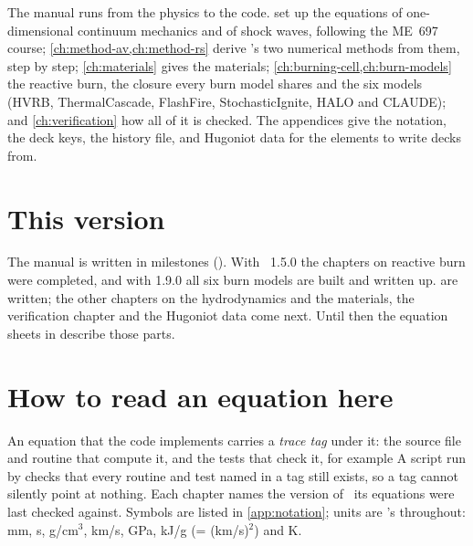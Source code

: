 The manual runs from the physics to the code. 
set up the equations of one-dimensional continuum mechanics and of shock
waves, following the ME~697 course; \cref{ch:method-av,ch:method-rs} derive
\bw's two numerical methods from them, step by step;
\cref{ch:materials} gives the materials; \cref{ch:burning-cell,ch:burn-models}
the reactive burn, the closure every burn model shares and the six models
(HVRB, ThermalCascade, FlashFire, StochasticIgnite, HALO and CLAUDE); and
\cref{ch:verification} how all of it is checked. The appendices give the
notation, the deck keys, the history file, and Hugoniot data for the
elements to write decks from.

\section{This version}

The manual is written in milestones (). With
\bw\ 1.5.0 the chapters on reactive burn were completed, and with 1.9.0
all six burn models are built and written up.
 are written; the other chapters on the hydrodynamics and the materials, the
verification chapter and the Hugoniot data come next. Until then the
equation sheets in  describe those parts.

\section{How to read an equation here}

An equation that the code implements carries a \emph{trace tag} under it:
the source file and routine that compute it, and the tests that check it,
for example
A script run by  checks that every routine and test named in
a tag still exists, so a tag cannot silently point at nothing. Each chapter
names the version of \bw\ its equations were last checked against.
Symbols are listed in \cref{app:notation}; units are \bw's throughout:
mm, \textmu s, g/cm$^3$, km/s, GPa, kJ/g (= (km/s)$^2$) and K.

